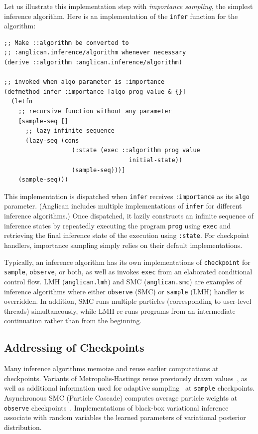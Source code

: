 \documentclass[sigconf]{acmart}
\begin{document}
Let us illustrate this implementation step with
\textit{importance sampling},
the simplest inference algorithm.
Here is an implementation of the \texttt{infer} function for the algorithm:
\begin{lstlisting}[style=default]
;; Make ::algorithm be converted to 
;; :anglican.inference/algorithm whenever necessary
(derive ::algorithm :anglican.inference/algorithm)

;; invoked when algo parameter is :importance
(defmethod infer :importance [algo prog value & {}]
  (letfn
    ;; recursive function without any parameter
    [sample-seq []
      ;; lazy infinite sequence 
      (lazy-seq (cons
                   (:state (exec ::algorithm prog value
                                   initial-state))
                   (sample-seq)))]
    (sample-seq)))
\end{lstlisting}
This implementation is dispatched 
when \texttt{infer} receives {\tt :im\-por\-tan\-ce} as its \texttt{algo} 
parameter. (Anglican includes multiple implementations of \texttt{infer}
for different inference algorithms.) Once dispatched, it lazily 
constructs an infinite sequence of inference states by repeatedly 
executing the program \texttt{prog} using \texttt{exec}
and retrieving the final inference state of the execution 
using \texttt{:state}. For checkpoint handlers, importance sampling simply
relies on their default implementations.

Typically, an inference
algorithm has its own implementations of
\texttt{checkpoint} for \texttt{sample}, \texttt{observe}, or
both, as well as invokes \texttt{exec} from an elaborated
conditional control flow. LMH (\texttt{anglican.lmh}) and SMC
(\texttt{anglican.smc}) are examples of inference algorithms
where either \texttt{observe} (SMC) or \texttt{sample} (LMH)
handler is overridden. In addition, SMC runs multiple particles
(corresponding to user-level threads) simultaneously, while LMH re-runs
programs from an intermediate continuation rather than from the
beginning.

\subsection{Addressing of Checkpoints}
\label{sec:addressing}

Many inference algorithms memoize and reuse earlier computations
at checkpoints. Variants of Metropolis-Hastings reuse previously
drawn values~\cite{WSG11}, as well as additional information
used for adaptive sampling~\cite{TMP+15} at \texttt{sample}
checkpoints. Asynchronous SMC (Particle Cascade) computes
average particle weights at \texttt{observe}
checkpoints~\cite{PWD+14}. Implementations of black-box
variational inference~\cite{WW13,MPT+16} associate with random
variables the learned parameters of variational posterior
distribution.
\end{document}
